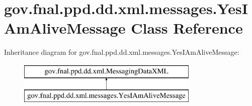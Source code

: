\hypertarget{classgov_1_1fnal_1_1ppd_1_1dd_1_1xml_1_1messages_1_1YesIAmAliveMessage}{\section{gov.\-fnal.\-ppd.\-dd.\-xml.\-messages.\-Yes\-I\-Am\-Alive\-Message Class Reference}
\label{classgov_1_1fnal_1_1ppd_1_1dd_1_1xml_1_1messages_1_1YesIAmAliveMessage}
}
Inheritance diagram for gov.\-fnal.\-ppd.\-dd.\-xml.\-messages.\-Yes\-I\-Am\-Alive\-Message\-:\begin{figure}[H]
\begin{center}
\leavevmode
\includegraphics[height=2.000000cm]{classgov_1_1fnal_1_1ppd_1_1dd_1_1xml_1_1messages_1_1YesIAmAliveMessage}
\end{center}
\end{figure}
